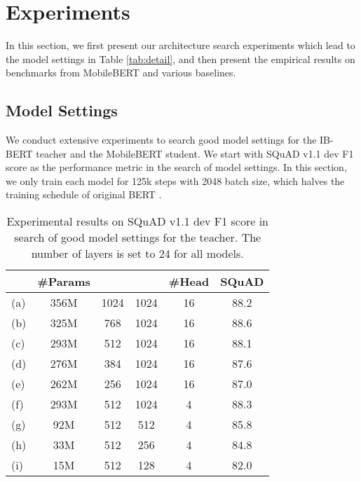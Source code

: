 \documentclass[11pt,a4paper]{article}
\begin{document}
\section{Experiments}
 
In this section, we first present our architecture search experiments which lead to the model settings in Table \ref{tab:detail}, and then present the empirical results on benchmarks from MobileBERT and various baselines. 

\subsection{Model Settings} \label{sec:nas} 

We conduct extensive experiments to search good model settings for the IB-BERT teacher and the MobileBERT student.
We start with SQuAD v1.1 dev F1 score as the performance metric in the search of model settings. In this section, we only train each model for 125k steps with 2048 batch size, which halves the training schedule of original BERT \citep{devlin2018bert,you2019large}.

\setlength{\tabcolsep}{2pt}

\begin{table}[t]
\centering
	    \small
		\begin{tabular}{l c c c c c}
			\hline
			& \textbf{\#Params} &  &  & \textbf{\#Head} & \textbf{SQuAD}\\
			\hline
			(a) & 356M & 1024 & 1024 & 16 & 88.2 \\
			(b) & 325M & 768 & 1024 & 16 & 88.6 \\
			(c) & 293M & 512 & 1024 & 16 & 88.1 \\
			(d) & 276M & 384 & 1024 & 16 & 87.6 \\
			(e) & 262M & 256 & 1024 & 16 & 87.0 \\
			\hline
			(f) & 293M & 512 & 1024 & 4 & 88.3 \\
			(g) & 92M & 512 & 512 & 4 & 85.8 \\
			(h) & 33M & 512 & 256 & 4 & 84.8 \\
            (i) & 15M & 512 & 128 & 4 & 82.0 \\
			\hline
		\end{tabular}
\caption{Experimental results on SQuAD v1.1 dev F1 score in search of good model settings for the  teacher.  The number of layers is set to 24 for all models.}
    \label{tab:bottleneck}
\end{table}
\setlength{\tabcolsep}{6pt}
\end{document}
